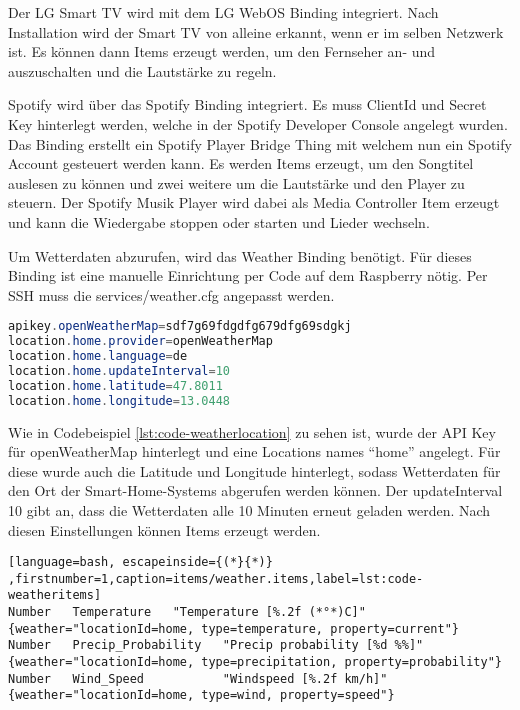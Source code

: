 		Der LG Smart TV wird mit dem LG WebOS Binding integriert. Nach Installation wird der Smart TV von alleine erkannt, wenn er im selben Netzwerk ist. Es können dann Items erzeugt werden, um den Fernseher an- und auszuschalten und die Lautstärke zu regeln.
		
		Spotify wird über das Spotify Binding integriert. Es muss ClientId und Secret Key hinterlegt werden, welche in der Spotify Developer Console angelegt wurden. Das Binding erstellt ein Spotify Player Bridge Thing mit welchem nun ein Spotify Account gesteuert werden kann. Es werden Items erzeugt, um den Songtitel auslesen zu können und zwei weitere um die Lautstärke und den Player zu steuern. Der Spotify Musik Player wird dabei als Media Controller Item erzeugt und kann die Wiedergabe stoppen oder starten und Lieder wechseln.
		
		Um Wetterdaten abzurufen, wird das Weather Binding benötigt. Für dieses Binding ist eine manuelle Einrichtung per Code auf dem Raspberry nötig. Per SSH muss die services/weather.cfg angepasst werden.
		
		\begin{lstlisting}[language=java,firstnumber=1,caption=services/weather.cfg,label=lst:code-weatherlocation]
apikey.openWeatherMap=sdf7g69fdgdfg679dfg69sdgkj
location.home.provider=openWeatherMap
location.home.language=de
location.home.updateInterval=10
location.home.latitude=47.8011
location.home.longitude=13.0448
		\end{lstlisting}
		
		Wie in Codebeispiel \ref{lst:code-weatherlocation} zu sehen ist, wurde der API Key für openWeatherMap hinterlegt und eine Locations names "`home"' angelegt. Für diese wurde auch die Latitude und Longitude hinterlegt, sodass Wetterdaten für den Ort der Smart-Home-Systems abgerufen werden können. Der updateInterval 10 gibt an, dass die Wetterdaten alle 10 Minuten erneut geladen werden.
		Nach diesen Einstellungen können Items erzeugt werden.
		
				\begin{lstlisting}[language=bash, escapeinside={(*}{*)} ,firstnumber=1,caption=items/weather.items,label=lst:code-weatheritems]
Number   Temperature   "Temperature [%.2f (*°*)C]"
{weather="locationId=home, type=temperature, property=current"}
Number   Precip_Probability   "Precip probability [%d %%]"
{weather="locationId=home, type=precipitation, property=probability"}
Number   Wind_Speed           "Windspeed [%.2f km/h]"
{weather="locationId=home, type=wind, property=speed"}
		\end{lstlisting}
		
